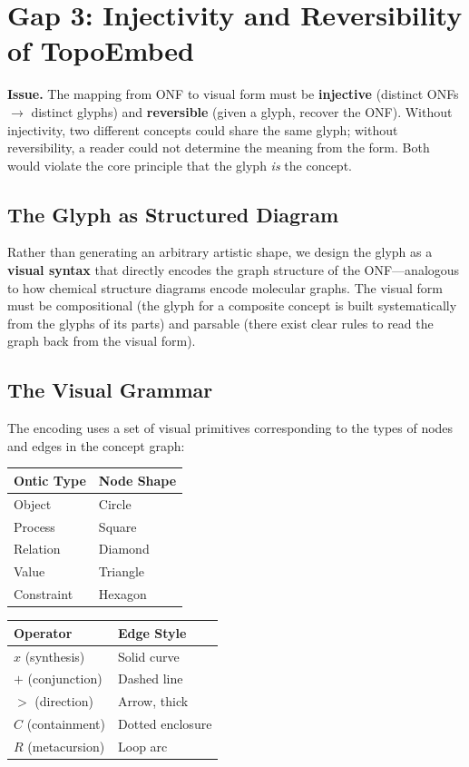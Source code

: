 \documentclass[12pt, letterpaper]{book}
\def\otimes{x}%
\def\oplus{+}%
\def\triangleright{>}%
\def\subset{C}%
\def\circlearrowleft{R}%
\begin{document}
\section{Gap 3: Injectivity and Reversibility of TopoEmbed}

\textbf{Issue.} The mapping from ONF to visual form must be \textbf{injective} (distinct ONFs $\to$ distinct glyphs) and \textbf{reversible} (given a glyph, recover the ONF). Without injectivity, two different concepts could share the same glyph; without reversibility, a reader could not determine the meaning from the form. Both would violate the core principle that the glyph \textit{is} the concept.

\subsection{The Glyph as Structured Diagram}

Rather than generating an arbitrary artistic shape, we design the glyph as a \textbf{visual syntax} that directly encodes the graph structure of the ONF---analogous to how chemical structure diagrams encode molecular graphs. The visual form must be compositional (the glyph for a composite concept is built systematically from the glyphs of its parts) and parsable (there exist clear rules to read the graph back from the visual form).

\subsection{The Visual Grammar}

The encoding uses a set of visual primitives corresponding to the types of nodes and edges in the concept graph:

\begin{center}
\begin{tabular}{ll}
\toprule
\textbf{Ontic Type} & \textbf{Node Shape} \\
\midrule
Object & Circle \\
Process & Square \\
Relation & Diamond \\
Value & Triangle \\
Constraint & Hexagon \\
\bottomrule
\end{tabular}
\qquad
\begin{tabular}{ll}
\toprule
\textbf{Operator} & \textbf{Edge Style} \\
\midrule
$\otimes$ (synthesis) & Solid curve \\
$\oplus$ (conjunction) & Dashed line \\
$\triangleright$ (direction) & Arrow, thick \\
$\subset$ (containment) & Dotted enclosure \\
$\circlearrowleft$ (metacursion) & Loop arc \\
\bottomrule
\end{tabular}
\end{center}
\end{document}
